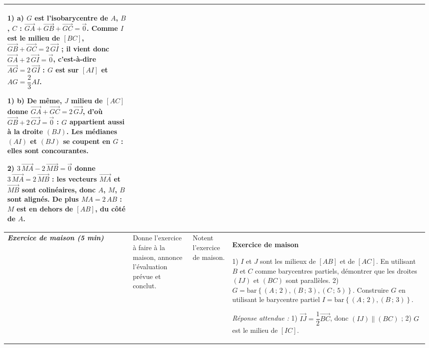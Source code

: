 \documentclass[10pt,a4paper,landscape]{article}
\newcommand{\vc}[1]{\overrightarrow{#1}}                                 %
\newcommand{\barG}[1]{\mathrm{bar}\left\{#1\right\}}                      %
\newcommand{\bleu}[1]{{\color{cBleu}\bfseries #1}}                        %
\newcommand{\moment}[1]{\textbf{\itshape #1}}                             %
\begin{document}
{\begin{longtable}{|J{2.12cm}|L{5.17cm}|L{4.37cm}|L{13.64cm}|}
\textbf{1) a)} $G$ est l'isobarycentre de $A$, $B$, $C$ : $\vc{GA}+\vc{GB}+\vc{GC}=\vc{0}$.
Comme $I$ est le milieu de $[BC]$, $\vc{GB}+\vc{GC}=2\,\vc{GI}$ ; il vient donc $\vc{GA}+2\,\vc{GI}=\vc{0}$,
c'est-à-dire $\vc{AG}=2\,\vc{GI}$ : $G$ est sur $[AI]$ et $AG=\dfrac{2}{3}AI$.

\textbf{1) b)} De même, $J$ milieu de $[AC]$ donne $\vc{GA}+\vc{GC}=2\,\vc{GJ}$, d'où
$\vc{GB}+2\,\vc{GJ}=\vc{0}$ : $G$ appartient aussi à la droite $(BJ)$. Les médianes $(AI)$ et $(BJ)$ se coupent
en $G$ : elles sont concourantes.

\textbf{2)} $3\,\vc{MA}-2\,\vc{MB}=\vc{0}$ donne $3\,\vc{MA}=2\,\vc{MB}$ : les vecteurs $\vc{MA}$ et $\vc{MB}$
sont colinéaires, donc $A$, $M$, $B$ sont alignés. De plus $MA=2\,AB$ : $M$ est en dehors de $[AB]$, du côté de
$A$.
\\
\hline
\moment{Exercice de maison (5 min)} &
Donne l'exercice à faire à la maison, annonce l'évaluation prévue et conclut. &
Notent l'exercice de maison. &
\bleu{Exercice de maison}

1) $I$ et $J$ sont les milieux de $[AB]$ et de $[AC]$. En utilisant $B$ et $C$ comme barycentres partiels,
démontrer que les droites $(IJ)$ et $(BC)$ sont parallèles.
2) $G=\barG{(A\,;\,2),(B\,;\,3),(C\,;\,5)}$. Construire $G$ en utilisant le barycentre partiel $I=\barG{(A\,;\,2),(B\,;\,3)}$.

\emph{Réponse attendue :} 1) $\vc{IJ}=\dfrac{1}{2}\vc{BC}$, donc $(IJ)\parallel(BC)$ ; 2) $G$ est le milieu de $[IC]$.
\\
\hline
\end{longtable}}
\end{document}

